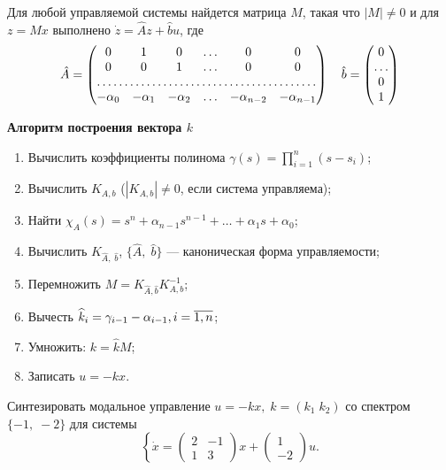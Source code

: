 \documentclass[../../TAU.tex]{subfiles}
\begin{document}
    \begin{statement}
        Для любой управляемой системы  найдется матрица $M$, такая что $|M|\neq0$ и для $z=Mx$ выполнено
        $\dot z = \hat A z + \hat b u$,
        где
        $$
            \hat A =
            \begin{pmatrix}
                0 & 1 & 0 & \ldots & 0 & 0 \\
                0 & 0 & 1 & \ldots & 0 & 0 \\
                \hdotsfor{6}\\
                -\alpha_0 & -\alpha_1 & -\alpha_2 & \ldots & -\alpha_{n-2} & -\alpha_{n-1}
            \end{pmatrix}\quad
            \hat b=
            \begin{pmatrix}
                0      \\
                \ldots \\
                0      \\
                1
            \end{pmatrix}
        $$
    \end{statement}

    \textbf{Алгоритм построения вектора $k$}

    \begin{enumerate}
    \item 
        Вычислить коэффициенты полинома $\gamma(s) = \prod_{i=1}^{n}(s-s_i)$;
    \item 
        Вычислить $K_{A,b}$ ($|K_{A,b}|\neq0$, если система управляема);
    \item 
        Найти $\chi_A(s) = s^n + \alpha_{n-1}s^{n-1} + \ldots + \alpha_1 s + \alpha_0$;
    \item 
        Вычислить $K_{\widehat A,\; \widehat b}$, $\{\widehat A,\; \widehat b\}$ --- каноническая форма управляемости;
    \item 
        Перемножить $M = K_{\widehat A, \widehat b} K^{-1}_{A,b}$;
    \item 
        Вычесть $\widehat k_i = \gamma_{i-1} - \alpha_{i-1}, i=\overline{1,n}$;
    \item 
        Умножить: $k = \widehat k M$;
    \item 
        Записать $u = -k x$.
    \end{enumerate}

    \examp Синтезировать модальное управление $u = - k x, \; k = (k_1\; k_2)$ со спектром $\{-1,\; -2\}$ для системы
    $$
        \left\{
        \dot x =
        \begin{pmatrix}
            2 & -1\\
            1 & 3
        \end{pmatrix}
         x + \begin{pmatrix}1\\ -2\end{pmatrix}u\right..
    $$
\end{document}
